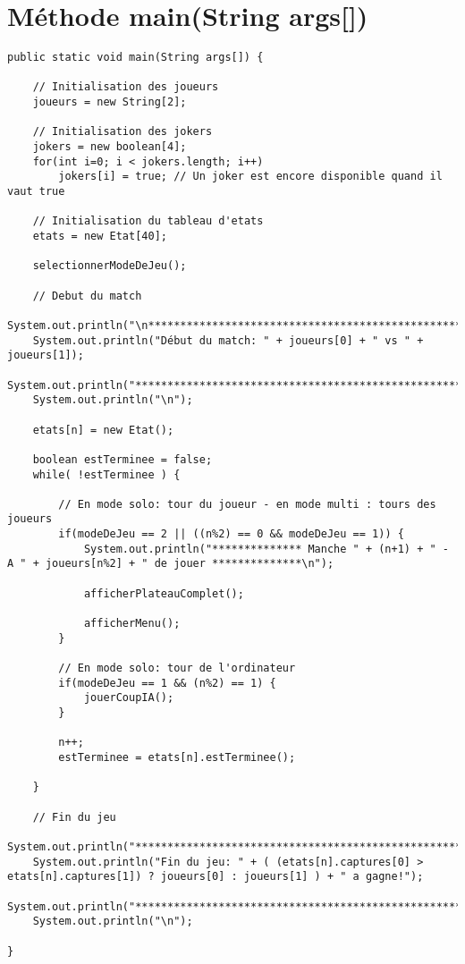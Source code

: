 \documentclass[11pt,a4paper]{report}
\begin{document}
    \section{Méthode main(String args[])}
        \begin{lstlisting}
public static void main(String args[]) {
    
    // Initialisation des joueurs
    joueurs = new String[2];

    // Initialisation des jokers
    jokers = new boolean[4];
    for(int i=0; i < jokers.length; i++)
        jokers[i] = true; // Un joker est encore disponible quand il vaut true

    // Initialisation du tableau d'etats
    etats = new Etat[40];
    
    selectionnerModeDeJeu();

    // Debut du match
    System.out.println("\n**************************************************************");
    System.out.println("Début du match: " + joueurs[0] + " vs " + joueurs[1]);
    System.out.println("**************************************************************");
    System.out.println("\n");

    etats[n] = new Etat();

    boolean estTerminee = false;
    while( !estTerminee ) {

        // En mode solo: tour du joueur - en mode multi : tours des joueurs
        if(modeDeJeu == 2 || ((n%2) == 0 && modeDeJeu == 1)) {
            System.out.println("************** Manche " + (n+1) + " - A " + joueurs[n%2] + " de jouer **************\n");
            
            afficherPlateauComplet();

            afficherMenu();
        }

        // En mode solo: tour de l'ordinateur
        if(modeDeJeu == 1 && (n%2) == 1) {
            jouerCoupIA();
        }

        n++;
        estTerminee = etats[n].estTerminee();

    }

    // Fin du jeu
    System.out.println("**************************************************************");
    System.out.println("Fin du jeu: " + ( (etats[n].captures[0] > etats[n].captures[1]) ? joueurs[0] : joueurs[1] ) + " a gagne!");
    System.out.println("**************************************************************");
    System.out.println("\n");

}
        \end{lstlisting}
\end{document}
